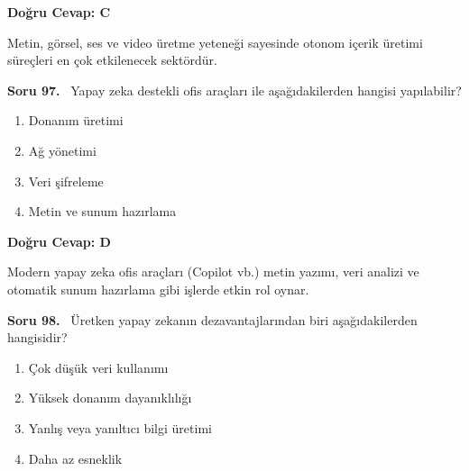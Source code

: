 \documentclass[11pt,a4paper,openany]{book}
\begin{document}
\vspace{4pt}
\begin{tcolorbox}[title=Cevap ve Açıklama, colback=gray!3!white, colframe=primarycolor!90!black, arc=2mm, fonttitle=\bfseries\sffamily, top=6pt, bottom=6pt]
    \textbf{Doğru Cevap: C}
    
    \vspace{2pt}
    Metin, görsel, ses ve video üretme yeteneği sayesinde otonom içerik üretimi süreçleri en çok etkilenecek sektördür.
\end{tcolorbox}
\vspace{10pt}
\needspace{5cm}
\vspace{8pt}
\noindent\textbf{\large\sffamily Soru 97.} \ Yapay zeka destekli ofis araçları ile aşağıdakilerden hangisi yapılabilir?

\begin{enumerate}[label=\Alph*), leftmargin=25pt, topsep=4pt, itemsep=2pt]
        \item Donanım üretimi
        \item Ağ yönetimi
        \item Veri şifreleme
        \item Metin ve sunum hazırlama
\end{enumerate}

\vspace{4pt}
\begin{tcolorbox}[title=Cevap ve Açıklama, colback=gray!3!white, colframe=primarycolor!90!black, arc=2mm, fonttitle=\bfseries\sffamily, top=6pt, bottom=6pt]
    \textbf{Doğru Cevap: D}
    
    \vspace{2pt}
    Modern yapay zeka ofis araçları (Copilot vb.) metin yazımı, veri analizi ve otomatik sunum hazırlama gibi işlerde etkin rol oynar.
\end{tcolorbox}
\vspace{10pt}
\needspace{5cm}
\vspace{8pt}
\noindent\textbf{\large\sffamily Soru 98.} \ Üretken yapay zekanın dezavantajlarından biri aşağıdakilerden hangisidir?

\begin{enumerate}[label=\Alph*), leftmargin=25pt, topsep=4pt, itemsep=2pt]
        \item Çok düşük veri kullanımı
        \item Yüksek donanım dayanıklılığı
        \item Yanlış veya yanıltıcı bilgi üretimi
        \item Daha az esneklik
\end{enumerate}
\end{document}
